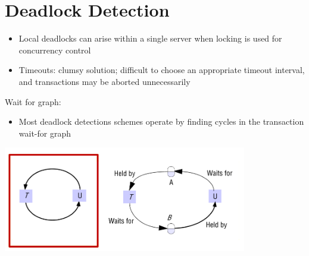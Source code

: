 \documentclass{article}[18pt]
\begin{document}
\section{Deadlock Detection}
\begin{itemize}
	\item Local deadlocks can arise within a single server when locking is used for concurrency control
	\item Timeouts: clumsy solution; difficult to choose an appropriate timeout interval, and transactions may be aborted unnecessarily
\end{itemize}
Wait for graph:
\begin{itemize}
	\item Most deadlock detections schemes operate by finding cycles in the transaction wait-for graph
\end{itemize}
\begin{center}
	\includegraphics[scale=0.7]{Wait-for}
\end{center}
\end{document}
